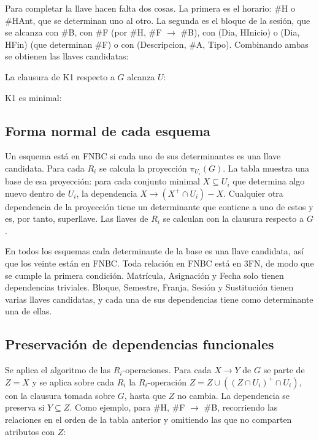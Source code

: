 

Para completar la llave hacen falta dos cosas. La primera es el horario: \#H o \#HAnt, que se determinan uno al otro. La segunda es el bloque de la sesión, que se alcanza con \#B, con \#F (por \#H, \#F $\to$ \#B), con (Dia, HInicio) o (Dia, HFin) (que determinan \#F) o con (Descripcion, \#A, Tipo). Combinando ambas se obtienen las llaves candidatas:



La clausura de K1 respecto a $G$ alcanza $U$:



K1 es minimal: 

\subsection{Forma normal de cada esquema}

Un esquema está en FNBC si cada uno de sus determinantes es una llave candidata. Para cada $R_i$ se calcula la proyección $\pi_{U_i}(G)$. La tabla muestra una base de esa proyección: para cada conjunto minimal $X \subseteq U_i$ que determina algo nuevo dentro de $U_i$, la dependencia $X \to (X^+ \cap U_i) - X$. Cualquier otra dependencia de la proyección tiene un determinante que contiene a uno de estos y es, por tanto, superllave. Las llaves de $R_i$ se calculan con la clausura respecto a $G$.



En todos los esquemas cada determinante de la base es una llave candidata, así que los veinte están en FNBC. Toda relación en FNBC está en 3FN, de modo que se cumple la primera condición. Matrícula, Asignación y Fecha solo tienen dependencias triviales. Bloque, Semestre, Franja, Sesión y Sustitución tienen varias llaves candidatas, y cada una de sus dependencias tiene como determinante una de ellas.

\subsection{Preservación de dependencias funcionales}

Se aplica el algoritmo de las $R_i$-operaciones. Para cada $X \to Y$ de $G$ se parte de $Z = X$ y se aplica sobre cada $R_i$ la $R_i$-operación $Z = Z \cup ((Z \cap U_i)^+ \cap U_i)$, con la clausura tomada sobre $G$, hasta que $Z$ no cambia. La dependencia se preserva si $Y \subseteq Z$. Como ejemplo, para \#H, \#F $\to$ \#B, recorriendo las relaciones en el orden de la tabla anterior y omitiendo las que no comparten atributos con $Z$:

